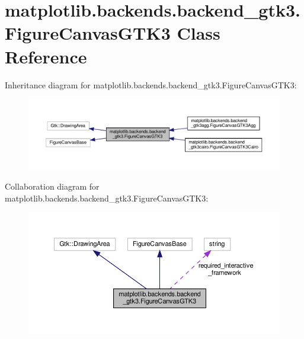 \hypertarget{classmatplotlib_1_1backends_1_1backend__gtk3_1_1FigureCanvasGTK3}{}\section{matplotlib.\+backends.\+backend\+\_\+gtk3.\+Figure\+Canvas\+G\+T\+K3 Class Reference}
\label{classmatplotlib_1_1backends_1_1backend__gtk3_1_1FigureCanvasGTK3}


Inheritance diagram for matplotlib.\+backends.\+backend\+\_\+gtk3.\+Figure\+Canvas\+G\+T\+K3\+:
\nopagebreak
\begin{figure}[H]
\begin{center}
\leavevmode
\includegraphics[width=350pt]{classmatplotlib_1_1backends_1_1backend__gtk3_1_1FigureCanvasGTK3__inherit__graph}
\end{center}
\end{figure}


Collaboration diagram for matplotlib.\+backends.\+backend\+\_\+gtk3.\+Figure\+Canvas\+G\+T\+K3\+:
\nopagebreak
\begin{figure}[H]
\begin{center}
\leavevmode
\includegraphics[width=350pt]{classmatplotlib_1_1backends_1_1backend__gtk3_1_1FigureCanvasGTK3__coll__graph}
\end{center}
\end{figure}
